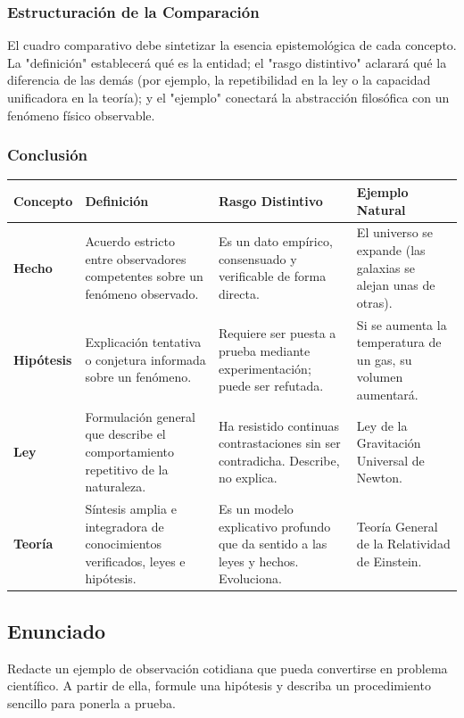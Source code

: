 \documentclass[12pt, a4paper]{article}
\begin{document}
\subsubsection*{Estructuración de la Comparación}
El cuadro comparativo debe sintetizar la esencia epistemológica de cada concepto. La "definición" establecerá qué es la entidad; el "rasgo distintivo" aclarará qué la diferencia de las demás (por ejemplo, la repetibilidad en la ley o la capacidad unificadora en la teoría); y el "ejemplo" conectará la abstracción filosófica con un fenómeno físico observable.

\subsubsection*{Conclusión}
\begin{center}
\renewcommand{\arraystretch}{1.5}
\begin{tabular}{|p{2cm}|p{4cm}|p{4cm}|p{4cm}|}
\hline
\textbf{Concepto} & \textbf{Definición} & \textbf{Rasgo Distintivo} & \textbf{Ejemplo Natural} \\
\hline
\textbf{Hecho} & Acuerdo estricto entre observadores competentes sobre un fenómeno observado. & Es un dato empírico, consensuado y verificable de forma directa. & El universo se expande (las galaxias se alejan unas de otras). \\
\hline
\textbf{Hipótesis} & Explicación tentativa o conjetura informada sobre un fenómeno. & Requiere ser puesta a prueba mediante experimentación; puede ser refutada. & Si se aumenta la temperatura de un gas, su volumen aumentará. \\
\hline
\textbf{Ley} & Formulación general que describe el comportamiento repetitivo de la naturaleza. & Ha resistido continuas contrastaciones sin ser contradicha. Describe, no explica. & Ley de la Gravitación Universal de Newton. \\
\hline
\textbf{Teoría} & Síntesis amplia e integradora de conocimientos verificados, leyes e hipótesis. & Es un modelo explicativo profundo que da sentido a las leyes y hechos. Evoluciona. & Teoría General de la Relatividad de Einstein. \\
\hline
\end{tabular}
\end{center}

\newpage

\subsection*{Enunciado}
Redacte un ejemplo de observación cotidiana que pueda convertirse en problema científico. A partir de ella, formule una hipótesis y describa un procedimiento sencillo para ponerla a prueba.
\end{document}
